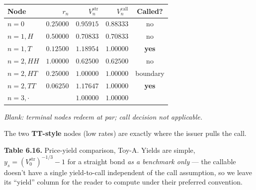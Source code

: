 \documentclass[
  10pt,
  twoside]{book}
\newcounter{none} %
\begin{document}
{\def\LTcaptype{none} %
\begin{table}[H]
\centering
\begin{tabular}{|l|r|r|r|c|}
\toprule
Node & \(r_n\) & \(V_n^{\text{str}}\) & \(V_n^{\text{call}}\) &
Called? \\
\midrule



\(n = 0\) & \(0.25000\) & \(0.95915\) & \(0.88333\) & no \\
\(n = 1, H\) & \(0.50000\) & \(0.70833\) & \(0.70833\) & no \\
\(n = 1, T\) & \(0.12500\) & \(1.18954\) & \(\mathbf{1.00000}\) &
\textbf{yes} \\
\(n = 2, HH\) & \(1.00000\) & \(0.62500\) & \(0.62500\) & no \\
\(n = 2, HT\) & \(0.25000\) & \(1.00000\) & \(1.00000\) & boundary \\
\(n = 2, TT\) & \(0.06250\) & \(1.17647\) & \(\mathbf{1.00000}\) &
\textbf{yes} \\
\(n = 3, \cdot\) & & \(1.00000\) & \(1.00000\) & \\
\bottomrule
\end{tabular}
\end{table}
}

\emph{Blank: terminal nodes redeem at par; call decision not
applicable.}

The two \textbf{TT-style} nodes (low rates) are exactly where the issuer
pulls the call.

\textbf{Table 6.16.} Price-yield comparison, Toy-A. Yields are simple,
\(y_s = (V_0^{\text{str}})^{-1/3} - 1\) for a straight bond \emph{as a
benchmark only} --- the callable doesn't have a single yield-to-call
independent of the call assumption, so we leave its ``yield'' column for
the reader to compute under their preferred convention.
\end{document}
